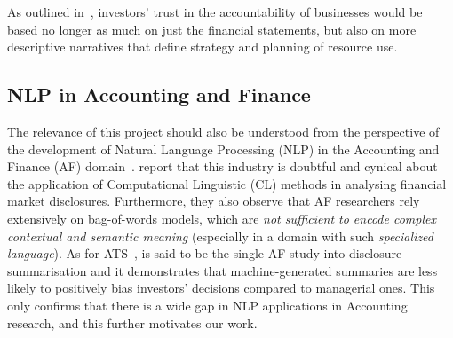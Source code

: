 As outlined in~\cite{elliott1998accounting}, investors’ trust in the accountability of businesses would be based no longer as much on just the financial statements, but also on more descriptive narratives that define strategy and planning of resource use.


\subsection{NLP in Accounting and Finance}\label{subsec:nlp-in-accounting-and-finance}
The relevance of this project should also be understood from the perspective of the development of Natural Language Processing (NLP) in the Accounting and Finance (AF) domain~\cite{el-haj2019meaning}.
report that this industry is doubtful and cynical about the application of Computational Linguistic (CL) methods in analysing financial market disclosures.
Furthermore, they also observe that AF researchers rely extensively on bag-of-words models, which are \emph{not sufficient to encode complex contextual and semantic meaning} (especially in a domain with such \emph{specialized language}).
As for ATS~\cite{hollander-white-af}, is said to be the single AF study into disclosure summarisation and it demonstrates that machine-generated summaries are less likely to positively bias investors' decisions compared to managerial ones.
This only confirms that there is a wide gap in NLP applications in Accounting research, and this further motivates our work.